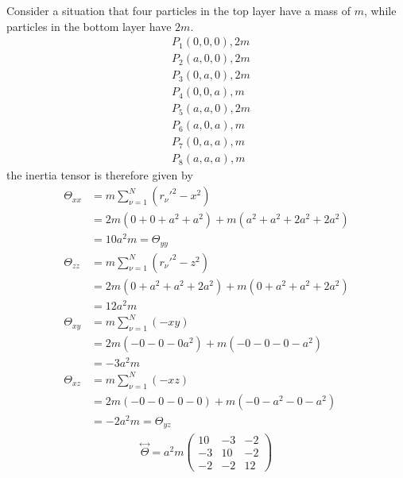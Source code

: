 \documentclass[11pt,a4paper]{article}
\newcommand{\tensor}{\stackrel{\leftrightarrow}}
\begin{document}
\begin{enumerate}
Consider a situation that four particles in the top layer have a mass of $m$, while particles in the bottom layer have $2m$.
\begin{align*}
&P_1(0,0,0),2m \\
&P_2(a,0,0),2m \\
&P_3(0,a,0),2m \\
&P_4(0,0,a),m \\
&P_5(a,a,0),2m \\
&P_6(a,0,a),m \\
&P_7(0,a,a),m \\
&P_8(a,a,a),m
\end{align*}
the inertia tensor is therefore given by
\begin{align}
\Theta_{xx}
&=m\sum_{\nu=1}^N (r_\nu'^2-x^2) \\
&=
2m(
0+
0+
a^2+
a^2)+
m(
a^2+
a^2+
2a^2+
2a^2
) \\
&=10a^2m=\Theta_{yy}\\
\Theta_{zz}
&=m\sum_{\nu=1}^N (r_\nu'^2-z^2) \\
&=
2m(
0+
a^2+
a^2+
2a^2)+
m(
0+
a^2+
a^2+
2a^2
) \\
&=12a^2m \\
\Theta_{xy}
&=m\sum_{\nu=1}^N (-xy) \\
&=
2m(
-0
-0
-0
a^2)+
m(
-0
-0
-0
-a^2
) \\
&=-3a^2m \\
\Theta_{xz}
&=m\sum_{\nu=1}^N (-xz) \\
&=
2m(
-0
-0
-0
-0)+
m(
-0
-a^2
-0
-a^2
) \\
&=-2a^2m=\Theta_{yz}
\end{align}
\begin{align}
\tensor{\Theta}=a^2m
\begin{pmatrix}
10 & -3 & -2 \\
-3 & 10 & -2 \\
-2 & -2 & 12
\end{pmatrix}
\end{align}

\end{enumerate}
\end{document}

